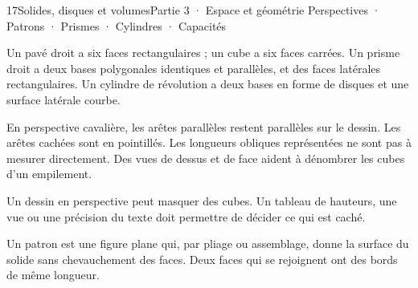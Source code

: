 \begin{ouverture}[geometrie]{17}{Solides, disques et volumes}{Partie 3 · Espace et géométrie}
{Perspectives · Patrons · Prismes · Cylindres · Capacités}
\end{ouverture}
\pagestyle{otMain}\essentiel\fontsize{11}{15}\selectfont
{}\label{cours-17-1}
\begin{definition}Un pavé droit a six faces rectangulaires ; un cube a six faces carrées. Un prisme droit a deux bases polygonales identiques et parallèles, et des faces latérales rectangulaires. Un cylindre de révolution a deux bases en forme de disques et une surface latérale courbe.\end{definition}
\label{fig-cours-17-1-cours-solides}

\begin{savoirfaire}En perspective cavalière, les arêtes parallèles restent parallèles sur le dessin. Les arêtes cachées sont en pointillés. Les longueurs obliques représentées ne sont pas à mesurer directement. Des vues de dessus et de face aident à dénombrer les cubes d’un empilement.\end{savoirfaire}
\begin{attention}Un dessin en perspective peut masquer des cubes. Un tableau de hauteurs, une vue ou une précision du texte doit permettre de décider ce qui est caché.\end{attention}
\clearpage
{}\label{cours-17-2}
\begin{definition}Un patron est une figure plane qui, par pliage ou assemblage, donne la surface du solide sans chevauchement des faces. Deux faces qui se rejoignent ont des bords de même longueur.\end{definition}
\label{fig-cours-17-2-cours-patrons}

